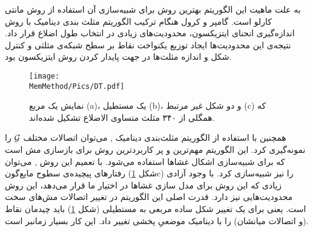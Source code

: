 به علت ماهیت این الگوریتم بهترین روش برای شبیه‌سازی آن استفاده از روش مانتی کارلو
است. گامپر و کرول هنگام ترکیب الگوریتم مثلث بندی دینامیک با روش اندازه‌گیری انحنای ایتزیکسون، محدودیت‌های زیادی در انتخاب طول اضلاع قرار داد. نتیجه‌ی این محدودیت‌ها ایجاد توزیع یکنواخت نقاط بر سطح شبکه‌ی مثلثی و کنترل شکل و اندازه مثلث‌ها در جهت پایدار کردن روش ایتزیکسون بود.

\begin{figure}[h]
\begin{center}
\texttt{[image: \\MemMethod/Pics/DT.pdf]}
\caption{
نمایش یک مربع (a)، یک مستطیل (b)، و دو شکل غیر مرتبط (c) که همگلی از ۳۴۰ مثلث متساوی الاضلاع تشکیل شده‌اند.
}  
\label{fig:meshDT}
\end{center}
\end{figure} 


همچنین با استفاده از الگوریتم مثلث‌بندی دینامیک 
\cite{Boal1992PRA, Gompper1992Science},
می‌توان اتصالات مختلف
 $\cal G$
را نمونه‌گیری کرد. این الگوریتم مهم‌ترین و پر کاربرد‌ترین روش برای بازسازی مش است که برای شبیه‌سازی اشکال غشا‌ها استفاده می‌شود. با تعمیم این روش
\cite{Kohyama2003PRE},
می‌توان رفتارهای پیچیده‌ی سطوح مایع‌گون (شکل 
\ref{fig:meshDT}c)
 را نیز شبیه‌سازی کرد. با وجود آزادی زیادی که این روش برای مدل سازی غشا‌ها در اختیار ما قرار می‌دهد، این روش محدودیت‌هایی نیز دارد. قدرت اصلی این الگوریتم در تغییر اتصالات مش‌های سخت است. یعنی برای یک تغییر شکل ساده مربعی به مستطیلی (شکل 
\ref{fig:meshDT})
 باید چیدمان نقاط (و اتصالات میانشان) را با دینامیک موضعیِ پخشی تغییر داد. این کار بسیار زمانبر است.













